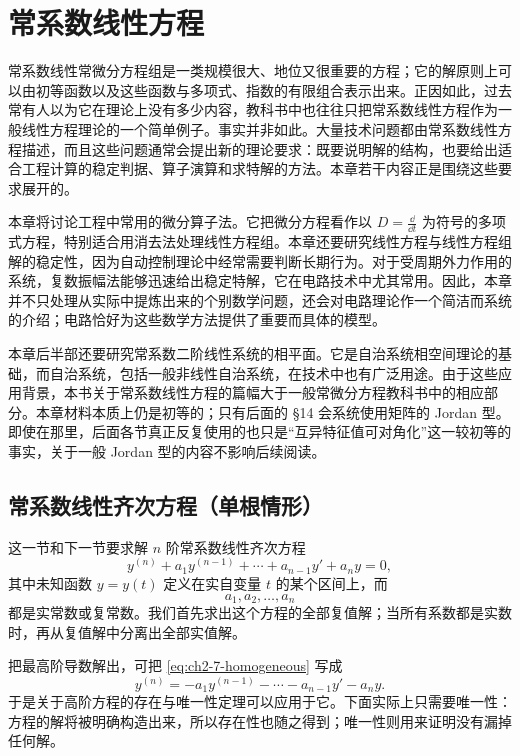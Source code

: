 \chapter{常系数线性方程}

常系数线性常微分方程组是一类规模很大、地位又很重要的方程；它的解原则上可以由初等函数以及这些函数与多项式、指数的有限组合表示出来。正因如此，过去常有人以为它在理论上没有多少内容，教科书中也往往只把常系数线性方程作为一般线性方程理论的一个简单例子。事实并非如此。大量技术问题都由常系数线性方程描述，而且这些问题通常会提出新的理论要求：既要说明解的结构，也要给出适合工程计算的稳定判据、算子演算和求特解的方法。本章若干内容正是围绕这些要求展开的。

本章将讨论工程中常用的微分算子法。它把微分方程看作以 \(D=\frac{\dd}{\dd t}\) 为符号的多项式方程，特别适合用消去法处理线性方程组。本章还要研究线性方程与线性方程组解的稳定性，因为自动控制理论中经常需要判断长期行为。对于受周期外力作用的系统，复数振幅法能够迅速给出稳定特解，它在电路技术中尤其常用。因此，本章并不只处理从实际中提炼出来的个别数学问题，还会对电路理论作一个简洁而系统的介绍；电路恰好为这些数学方法提供了重要而具体的模型。

本章后半部还要研究常系数二阶线性系统的相平面。它是自治系统相空间理论的基础，而自治系统，包括一般非线性自治系统，在技术中也有广泛用途。由于这些应用背景，本书关于常系数线性方程的篇幅大于一般常微分方程教科书中的相应部分。本章材料本质上仍是初等的；只有后面的 §14 会系统使用矩阵的 Jordan 型。即使在那里，后面各节真正反复使用的也只是“互异特征值可对角化”这一较初等的事实，关于一般 Jordan 型的内容不影响后续阅读。

\setcounter{section}{6}
\setcounter{theorem}{3}

\section{常系数线性齐次方程（单根情形）}

这一节和下一节要求解 \(n\) 阶常系数线性齐次方程
\begin{equation}
 y^{(n)}+a_1y^{(n-1)}+\cdots+a_{n-1}y'+a_ny=0,
 \label{eq:ch2-7-homogeneous}
\end{equation}
其中未知函数 \(y=y(t)\) 定义在实自变量 \(t\) 的某个区间上，而
\[
 a_1,a_2,\ldots,a_n
\]
都是实常数或复常数。我们首先求出这个方程的全部复值解；当所有系数都是实数时，再从复值解中分离出全部实值解。

把最高阶导数解出，可把 \eqref{eq:ch2-7-homogeneous} 写成
\begin{equation}
 y^{(n)}
 =-a_1y^{(n-1)}-\cdots-a_{n-1}y'-a_ny.
 \label{eq:ch2-7-solved-highest}
\end{equation}
于是关于高阶方程的存在与唯一性定理可以应用于它。下面实际上只需要唯一性：方程的解将被明确构造出来，所以存在性也随之得到；唯一性则用来证明没有漏掉任何解。

